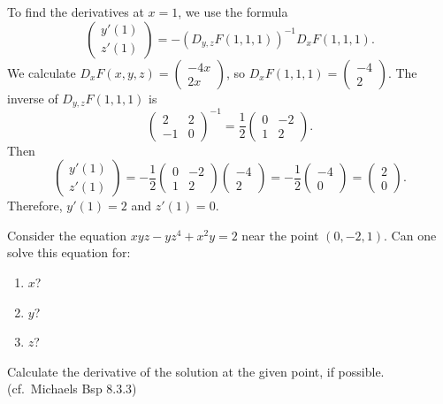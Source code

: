 \begin{exercisesolution}
To find the derivatives at $x=1$, we use the formula
\[
\begin{pmatrix} y'(1) \\ z'(1) \end{pmatrix} = - (D_{y,z} F(1,1,1))^{-1} D_x F(1,1,1).
\]
We calculate $D_x F(x,y,z) = \begin{pmatrix} -4x \\ 2x \end{pmatrix}$, so $D_x F(1,1,1) = \begin{pmatrix} -4 \\ 2 \end{pmatrix}$.
The inverse of $D_{y,z} F(1,1,1)$ is
\[
\begin{pmatrix} 2 & 2 \\ -1 & 0 \end{pmatrix}^{-1} = \frac{1}{2} \begin{pmatrix} 0 & -2 \\ 1 & 2 \end{pmatrix}.
\]
Then
\[
\begin{pmatrix} y'(1) \\ z'(1) \end{pmatrix} = - \frac{1}{2} \begin{pmatrix} 0 & -2 \\ 1 & 2 \end{pmatrix} \begin{pmatrix} -4 \\ 2 \end{pmatrix} = - \frac{1}{2} \begin{pmatrix} -4 \\ 0 \end{pmatrix} = \begin{pmatrix} 2 \\ 0 \end{pmatrix}.
\]
Therefore, $y'(1) = 2$ and $z'(1) = 0$.
\end{exercisesolution}

\begin{exercise}
\label{ex:implicit_xyz_equation}
Consider the equation $xyz - yz^4 + x^2y = 2$ near the point $(0,-2,1)$. Can one solve this equation for:
\begin{enumerate}[label=\textbf{(\alph*)}]
  \item $x$?
  \item $y$?
  \item $z$?
\end{enumerate}
Calculate the derivative of the solution at the given point, if possible. (cf.\ Michaels Bsp 8.3.3)
\end{exercise}

